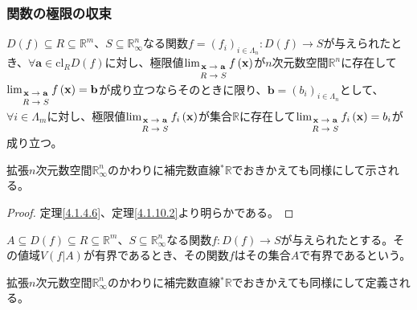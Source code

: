 \documentclass[dvipdfmx]{jsarticle}
\begin{document}
\subsubsection{関数の極限の収束}%
\begin{thm}\label{4.1.10.6}
$D(f) \subseteq R \subseteq \mathbb{R}^{m}$、$S \subseteq \mathbb{R}_{\infty}^{n}$なる関数$f = \left( f_{i} \right)_{i \in \varLambda_{n}}:D(f) \rightarrow S$が与えられたとき、$\forall\mathbf{a} \in \mathrm{cl}_{R}{D(f)}$に対し、極限値$\lim_{\scriptsize \begin{matrix} \mathbf{x} \rightarrow \mathbf{a} \\ R \rightarrow S \\\end{matrix}}{f\left( \mathbf{x} \right)}$が$n$次元数空間$\mathbb{R}^{n}$に存在して$\lim_{\scriptsize \begin{matrix} \mathbf{x} \rightarrow \mathbf{a} \\ R \rightarrow S \\\end{matrix}}{f\left( \mathbf{x} \right)} = \mathbf{b}$が成り立つならそのときに限り、$\mathbf{b} = \left( b_{i} \right)_{i \in \varLambda_{n}}$として、$\forall i \in \varLambda_{m}$に対し、極限値$\lim_{\scriptsize \begin{matrix} \mathbf{x} \rightarrow \mathbf{a} \\ R \rightarrow S \\\end{matrix}}{f_{i}\left( \mathbf{x} \right)}$が集合$\mathbb{R}$に存在して$\lim_{\scriptsize \begin{matrix} \mathbf{x} \rightarrow \mathbf{a} \\ R \rightarrow S \\\end{matrix}}{f_{i}\left( \mathbf{x} \right)} = b_{i}$が成り立つ。\par
拡張$n$次元数空間$\mathbb{R}_{\infty}^{n}$のかわりに補完数直線${}^{*}\mathbb{R}$でおきかえても同様にして示される。
\end{thm}
\begin{proof} 定理\ref{4.1.4.6}、定理\ref{4.1.10.2}より明らかである。
\end{proof}
\begin{dfn}
$A \subseteq D(f) \subseteq R \subseteq \mathbb{R}^{m}$、$S \subseteq \mathbb{R}_{\infty}^{n}$なる関数$f:D(f) \rightarrow S$が与えられたとする。その値域$V\left( f|A \right)$が有界であるとき、その関数$f$はその集合$A$で有界であるという。\par
拡張$n$次元数空間$\mathbb{R}_{\infty}^{n}$のかわりに補完数直線${}^{*}\mathbb{R}$でおきかえても同様にして定義される。
\end{dfn}
\end{document}
